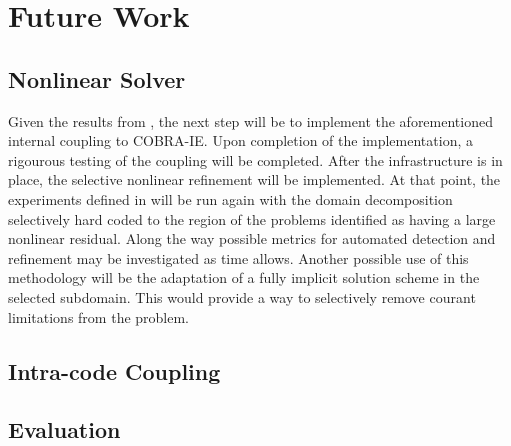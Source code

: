 \chapter{Future Work}
\label{chap:future}

\section{Nonlinear Solver}
\label{sect:future_nonlinear_solver}

Given the results from , the next step will be to implement the aforementioned internal coupling to COBRA-IE.
Upon completion of the implementation, a rigourous testing of the coupling will be completed.
After the infrastructure is in place, the selective nonlinear refinement will be implemented.
At that point, the experiments defined in  will be run again with the domain decomposition selectively hard coded to the region of the problems identified as having a large nonlinear residual.
Along the way possible metrics for automated detection and refinement may be investigated as time allows.
Another possible use of this methodology will be the adaptation of a fully implicit solution scheme in the selected subdomain.
This would provide a way to selectively remove courant limitations from the problem.


\section{Intra-code Coupling}
\label{sect:future_intracode_coupling}



\section{Evaluation}
\label{sect:future_eval}






